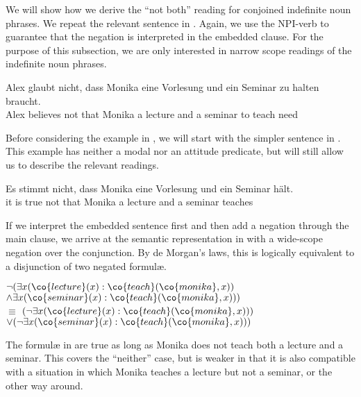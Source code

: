 \documentclass[output=paper]{langsci/langscibook}
\begin{document}
We will show how we derive the ``not both'' reading for conjoined indefinite noun phrases. 
We repeat the relevant sentence in . 
Again, we use the NPI-verb  to guarantee that the negation is interpreted in the embedded clause.
For the purpose of this subsection, we are only interested in narrow scope readings of the indefinite noun phrases.



\ea \label{ex-glaub-notEX2}
\gll Alex glaubt nicht, dass Monika eine Vorlesung und ein Seminar zu halten braucht.\\
Alex believes not that Monika a lecture and a seminar to teach need\\
\glt {}
\z 

Before considering the example in , we will start with the simpler sentence in . This example has neither a modal nor an attitude predicate, but will still allow us to describe the relevant readings.

\ea \label{notEX}
\gll Es stimmt nicht, dass Monika eine Vorlesung und ein Seminar hält.\\
it {is true} not that Monika a lecture and a seminar teaches\\
\glt {}
\z 

If we interpret the embedded sentence first and then add a negation through the main clause, we arrive at the semantic representation in  with a wide-scope negation over the conjunction. 
By de Morgan's laws, this is logically equivalent to
 a disjunction of two negated formulæ.

\ea \label{notEX-bi-lf}
$\lnot (\exists x (\co{lecture}(x) : \co{teach}(\co{monika},x))$\\
\hspace*{\fill}
$\land \exists x (\co{seminar}(x) : \co{teach}(\co{monika},x)))$\\
$\equiv$
$(\lnot \exists x (\co{lecture}(x) : \co{teach}(\co{monika},x)))$\\
\hspace*{\fill} $\lor (\lnot \exists x (\co{seminar}(x) : \co{teach}(\co{monika},x)))$
\z 
 
The formulæ in  are true as long as Monika does not teach both a lecture and a seminar. This covers the ``neither'' case, but is weaker in that it is also compatible with a situation in which Monika teaches a lecture but not a seminar, or the other way around.
\end{document}
